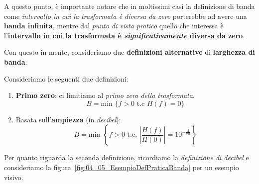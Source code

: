 A questo punto, è importante notare che in moltissimi casi la definizione di banda 
come \textit{intervallo in cui la trasformata è diversa da zero} 
porterebbe ad avere una \textbf{banda infinita}, mentre dal \textit{punto di vista pratico} 
quello che interessa è l’\textbf{intervallo in cui la trasformata è \textit{significativamente}
diversa da zero}.

Con questo in mente, consideriamo due \textbf{definizioni alternative}
di \textbf{larghezza di banda}:

\begin{definition}
    Consideriamo le seguenti due definizioni:
    \begin{enumerate}
        \item \textbf{Primo zero}: ci limitiamo al \textit{primo zero della trasformata}.
            \[
                B = \text{min } \{ f > 0 \text{ t.c } H(f) = 0 \}  
            \] 
        \item Basata sull'\textbf{ampiezza} (in \textit{decibel}):
            \[
                B = \text{min } \left\{ f > 0 \text{ t.c. } \left| \frac{H(f)}{H(0)} \right| 
                = 10^{- \frac{A}{20}} \right\}
            \] 
    \end{enumerate}
\end{definition}

Per quanto riguarda la seconda definizione, ricordiamo la \textit{definizione di decibel}
e consideriamo la figura~\ref{fig:04_05_EsempioDefPraticaBanda} per un esempio visivo.

